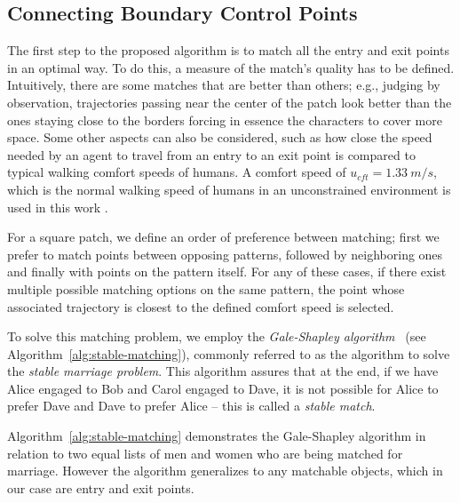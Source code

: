 \subsection{Connecting Boundary Control Points}
\label{sec:method:init}

The first step to the proposed algorithm is to match all the entry and exit points in an optimal way.
To do this, a measure of the match's quality has to be defined.
Intuitively, there are some matches that are better than others; e.g., judging by observation, trajectories passing near the center of the patch look better than the ones staying close to the borders forcing in essence the characters to cover more space.
Some other aspects can also be considered, such as how close the speed needed by an agent to travel from an entry to an exit point is compared to typical walking comfort speeds of humans.
A comfort speed of $u_{cft} = 1.33~m/s$, which is the normal walking speed of humans in an unconstrained environment is used in this work \cite{Whittle2003Gait}.

For a square patch, we define an order of preference between matching; first we prefer to match points between opposing patterns, followed by neighboring ones and finally with points on the pattern itself.
For any of these cases, if there exist multiple possible matching options on the same pattern, the point whose associated trajectory is closest to the defined comfort speed is selected.

To solve this matching problem, we employ the \emph{Gale-Shapley algorithm}~\cite{gale1962college} (see Algorithm~\ref{alg:stable-matching}), commonly referred to as the algorithm to solve the \emph{stable marriage problem}. 
This algorithm assures that at the end, if we have Alice engaged to Bob and Carol engaged to Dave, it is not possible for Alice to prefer Dave and Dave to prefer Alice -- this is called a \emph{stable match}.  

Algorithm~\ref{alg:stable-matching} demonstrates the Gale-Shapley algorithm in relation to two equal lists of men and women who are being matched for marriage.
However the algorithm generalizes to any matchable objects, which in our case are entry and exit points.

